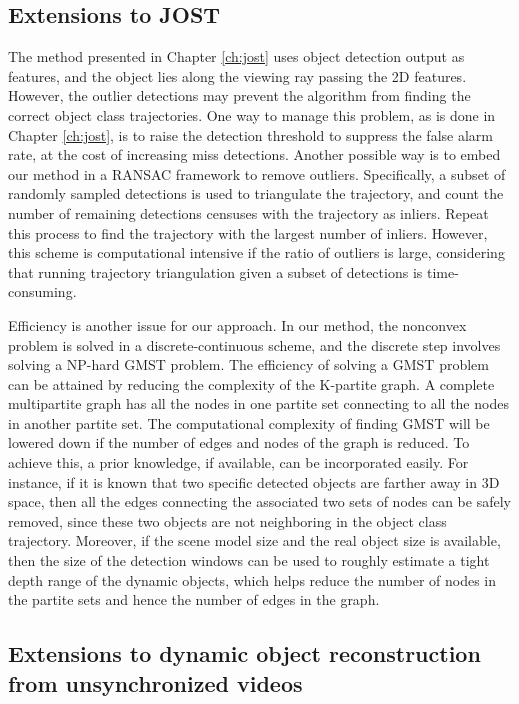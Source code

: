 \subsection{Extensions to JOST}

The method presented in Chapter \ref{ch:jost} uses object detection output as features, and the object lies along the viewing ray passing the 2D features. However, the outlier detections may prevent the algorithm from finding the correct object class trajectories. One way to manage this problem, as is done in Chapter \ref{ch:jost}, is to raise the detection threshold to suppress the false alarm rate, at the cost of increasing miss detections. Another possible way is to embed our method in a RANSAC framework \cite{Hartley2004} to remove outliers. Specifically, a subset of randomly sampled detections is used to triangulate the trajectory, and count the number of remaining detections censuses with the trajectory as inliers. Repeat this process to find the trajectory with the largest number of inliers. However, this scheme is computational intensive if the ratio of outliers is large, considering that running trajectory triangulation given a subset of detections is time-consuming. 

Efficiency is another issue for our approach. In our method, the nonconvex problem is solved in a discrete-continuous scheme, and the discrete step involves solving a NP-hard GMST problem. The efficiency of solving a GMST problem can be attained by reducing the complexity of the K-partite graph. A complete multipartite graph has all the nodes in one partite set connecting to all the nodes in another partite set. The computational complexity of finding GMST will be lowered down if the number of edges and nodes of the graph is reduced. 
To achieve this, a prior knowledge, if available, can be incorporated easily. 
For instance, if it is known that two specific detected objects are farther away in 3D space, then all the edges connecting the associated two sets of nodes can be safely removed, since these two objects are not neighboring in the object class trajectory. Moreover, if the scene model size and the real object size is available, then the size of the detection windows can be used to roughly estimate a tight depth range of the dynamic objects, which helps reduce the number of nodes in the partite sets and hence the number of edges in the graph.

\subsection{Extensions to dynamic object reconstruction from unsynchronized videos}

